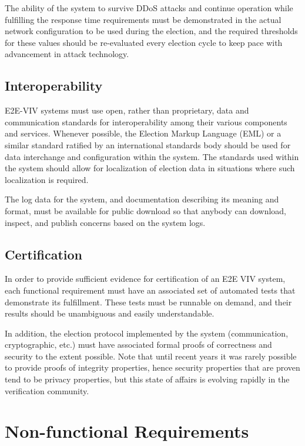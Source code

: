 The ability of the system to survive DDoS attacks and continue
operation while fulfilling the response time requirements must be
demonstrated in the actual network configuration to be used during the
election, and the required thresholds for these values should be
re-evaluated every election cycle to keep pace with advancement in
attack technology.

\subsection{Interoperability}
\label{sec:interoperability}

E2E-VIV systems must use open, rather than proprietary, data and
communication standards for interoperability among their various
components and services. Whenever possible, the Election Markup
Language (EML) or a similar standard ratified by an international
standards body should be used for data interchange and configuration
within the system. The standards used within the system should allow
for localization of election data in situations where such
localization is required.

The log data for the system, and documentation describing its meaning
and format, must be available for public download so that anybody can
download, inspect, and publish concerns based on the system logs. 

\subsection{Certification}

In order to provide sufficient evidence for certification of an E2E
VIV system, each functional requirement must have an associated set of
automated tests that demonstrate its fulfillment. These tests must be
runnable on demand, and their results should be unambiguous and easily
understandable.

In addition, the election protocol implemented by the system
(communication, cryptographic, etc.) must have associated formal
proofs of correctness and security to the extent possible. Note that
until recent years it was rarely possible to provide proofs of
integrity properties, hence security properties that are proven
tend to be privacy properties, but this state of affairs is evolving
rapidly in the verification community.

\section{Non-functional Requirements}

